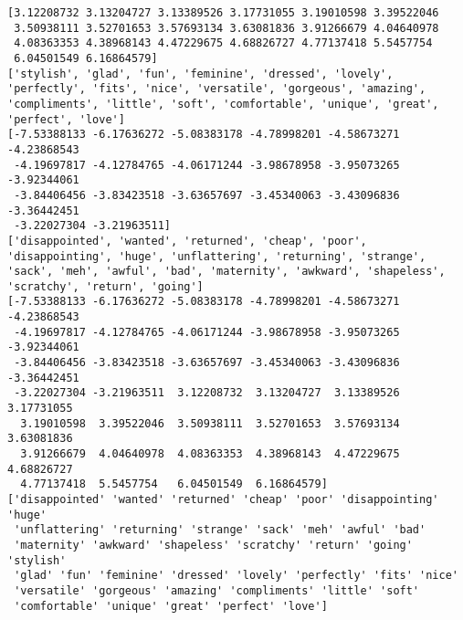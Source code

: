 \documentclass[11pt]{article}
\begin{document}
    \begin{Verbatim}[commandchars=\\\{\}]
[3.12208732 3.13204727 3.13389526 3.17731055 3.19010598 3.39522046
 3.50938111 3.52701653 3.57693134 3.63081836 3.91266679 4.04640978
 4.08363353 4.38968143 4.47229675 4.68826727 4.77137418 5.5457754
 6.04501549 6.16864579]
['stylish', 'glad', 'fun', 'feminine', 'dressed', 'lovely', 'perfectly', 'fits', 'nice', 'versatile', 'gorgeous', 'amazing', 'compliments', 'little', 'soft', 'comfortable', 'unique', 'great', 'perfect', 'love']
[-7.53388133 -6.17636272 -5.08383178 -4.78998201 -4.58673271 -4.23868543
 -4.19697817 -4.12784765 -4.06171244 -3.98678958 -3.95073265 -3.92344061
 -3.84406456 -3.83423518 -3.63657697 -3.45340063 -3.43096836 -3.36442451
 -3.22027304 -3.21963511]
['disappointed', 'wanted', 'returned', 'cheap', 'poor', 'disappointing', 'huge', 'unflattering', 'returning', 'strange', 'sack', 'meh', 'awful', 'bad', 'maternity', 'awkward', 'shapeless', 'scratchy', 'return', 'going']
[-7.53388133 -6.17636272 -5.08383178 -4.78998201 -4.58673271 -4.23868543
 -4.19697817 -4.12784765 -4.06171244 -3.98678958 -3.95073265 -3.92344061
 -3.84406456 -3.83423518 -3.63657697 -3.45340063 -3.43096836 -3.36442451
 -3.22027304 -3.21963511  3.12208732  3.13204727  3.13389526  3.17731055
  3.19010598  3.39522046  3.50938111  3.52701653  3.57693134  3.63081836
  3.91266679  4.04640978  4.08363353  4.38968143  4.47229675  4.68826727
  4.77137418  5.5457754   6.04501549  6.16864579]
['disappointed' 'wanted' 'returned' 'cheap' 'poor' 'disappointing' 'huge'
 'unflattering' 'returning' 'strange' 'sack' 'meh' 'awful' 'bad'
 'maternity' 'awkward' 'shapeless' 'scratchy' 'return' 'going' 'stylish'
 'glad' 'fun' 'feminine' 'dressed' 'lovely' 'perfectly' 'fits' 'nice'
 'versatile' 'gorgeous' 'amazing' 'compliments' 'little' 'soft'
 'comfortable' 'unique' 'great' 'perfect' 'love']

    \end{Verbatim}

    \begin{center}
    \end{center}
    { \hspace*{\fill} \\}
    
\end{document}
